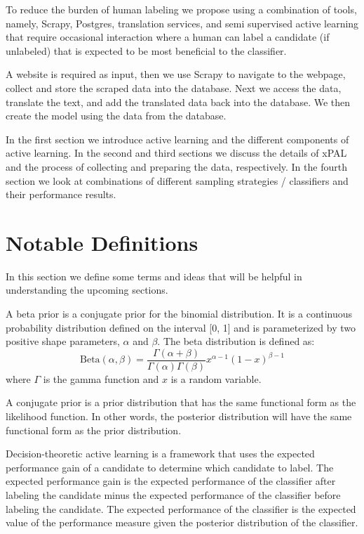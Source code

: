 To reduce the burden of human labeling we propose using a combination of tools, namely, Scrapy, Postgres, translation services, and semi supervised active learning that require occasional interaction where a human can label a candidate (if unlabeled) that is expected to be most beneficial to the classifier. 

A website is required as input, then we use Scrapy to navigate to the webpage, collect and store the scraped data into the database. Next we access the data, translate the text, and add the translated data back into the database. We then create the model using the data from the database. 

In the first section we introduce active learning and the different components of active learning. In the second and third sections we discuss the details of xPAL and the process of collecting and preparing the data, respectively. In the fourth section we look at combinations of different sampling strategies / classifiers and their performance results.

\section{Notable Definitions}

In this section we define some terms and ideas that will be helpful in understanding the upcoming sections.

\begin{defn}
\label{def:beta_prior}
A beta prior is a conjugate prior for the binomial distribution. It is a continuous probability distribution defined on the interval [0, 1] and is parameterized by two positive shape parameters, \(\alpha\) and \(\beta\). The beta distribution is defined as: 
\[\text{Beta}(\alpha, \beta) = \frac{\Gamma(\alpha + \beta)}{\Gamma(\alpha)\Gamma(\beta)}x^{\alpha - 1}(1 - x)^{\beta - 1}\]
where \(\Gamma\) is the gamma function and \(x\) is a random variable.
\end{defn}

\begin{defn}
\label{def:conjugate_prior}
A conjugate prior is a prior distribution that has the same functional form as the likelihood function. In other words, the posterior distribution will have the same functional form as the prior distribution.
\end{defn}

\begin{defn}
\label{def:decision_theoretic}
Decision-theoretic active learning is a framework that uses the expected performance gain of a candidate to determine which candidate to label. The expected performance gain is the expected performance of the classifier after labeling the candidate minus the expected performance of the classifier before labeling the candidate. The expected performance of the classifier is the expected value of the performance measure given the posterior distribution of the classifier.
\end{defn}


